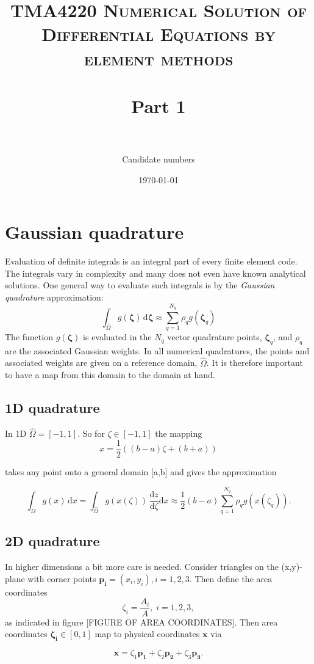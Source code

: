 \documentclass[paper=a4, fontsize=11pt]{scrartcl} %
\title{	
\normalfont \normalsize 
\textsc{TMA4220 Numerical Solution of Differential Equations by element methods} \\ [25pt] %
\horrule{0.5pt} \\[0.4cm] %
\huge Part 1 \\ %
\horrule{2pt} \\[0.5cm] %
}
\author{Candidate numbers} %
\date{\normalsize\today} %
\begin{document}
\maketitle

\section{Gaussian quadrature}
Evaluation of definite integrals is an integral part of every finite element code. The integrals vary in complexity and many does not even have known analytical solutions. One general way to evaluate such integrals is by the \textit{Gaussian quadrature} approximation:
\[ \int_{\hat{\Omega}} \! g(\mathbf{\zeta}) \, \mathrm{d}\mathbf{\zeta} \approx \sum_{q=1}^{N_q} \rho_{q}g(\mathbf{\zeta}_q)
\]
The function $g(\mathbf{\zeta})$ is evaluated in the $N_q$ vector quadrature points, $\mathbf{\zeta}_q$, and $\rho_q$ are the associated Gaussian weights. In all numerical quadratures, the points and associated weights are given on a reference domain, $\hat{\Omega}$. It is therefore important to have a map from this domain to the domain at hand.

\subsection{1D quadrature}

In 1D $\hat{\Omega}=[-1,1]$. So for $\zeta \in [-1,1]$ the mapping
\[ x=\frac{1}{2} \left((b-a) \zeta +(b+a)\right)
\]

takes any point onto a general domain [a,b] and gives the approximation

\[ \int_{\Omega} \! g(x) \, \mathrm{d}x = \int_{\hat{\Omega}} \! g\left(x(\zeta)\right) \, \frac{\mathrm{d}z}{\mathrm{d}\zeta}\mathrm{d}x \approx \frac{1}{2}(b-a) \sum_{q=1}^{N_q} \rho_{q}g(x(\zeta_q)).
\]

\subsection{2D quadrature}
In higher dimensions a bit more care is needed. Consider triangles on the (x,y)-plane with corner points $\mathbf{p_i}=(x_i,y_i), i=1,2,3$. Then define the area coordinates 
\[ \zeta_i = \frac{A_i}{A}, \; i=1,2,3,\]
as indicated in figure [FIGURE OF AREA COORDINATES]. Then area coordinates $\mathbf{\zeta_i} \in [0,1]$ map to physical coordinates $\mathbf{x}$ via

\[ \mathbf{x} = \zeta_1\mathbf{p_1} +\zeta_2\mathbf{p_2} +\zeta_3\mathbf{p_3}.
\]
\end{document}
